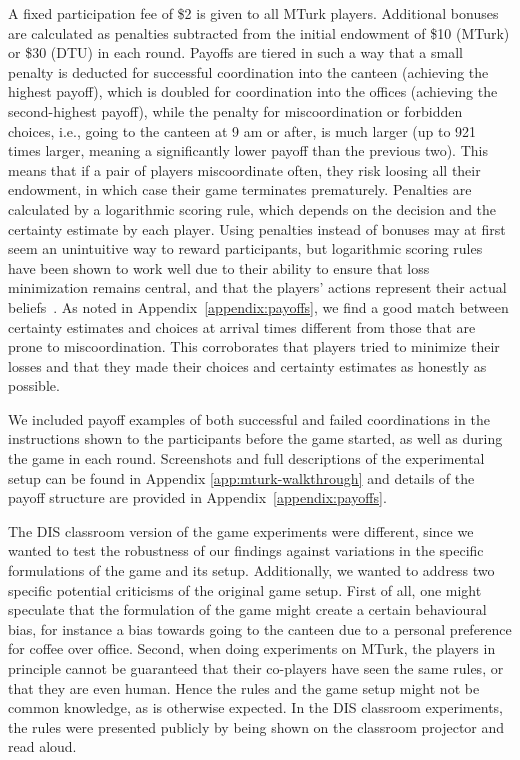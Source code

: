 A fixed participation fee of \$2 is given to all MTurk players. Additional bonuses are calculated as penalties subtracted from the initial endowment of \$10 (MTurk) or \$30 (DTU) in each round. Payoffs are tiered in such a way that a small penalty is deducted for successful coordination into the canteen (achieving the highest payoff), which is doubled for coordination into the offices (achieving the second-highest payoff), while the penalty for miscoordination or forbidden choices, i.e., going to the canteen at 9 am or after, is much larger (up to 921 times larger, meaning a significantly lower payoff than the previous two). This means that if a pair of players miscoordinate often, they risk loosing all their endowment, in which case their game terminates prematurely. Penalties are calculated by a logarithmic scoring rule, which depends on the decision and the certainty estimate by each player. Using penalties instead of bonuses may at first seem an unintuitive way to reward participants, but logarithmic scoring rules have been shown to work well due to their ability to ensure that loss minimization remains central, and that the players' actions represent their actual beliefs~\cite{good1992rational, seidenfeld1985calibration, palfrey2009eliciting, mccutcheon2019favor}. %
As noted in Appendix~\ref{appendix:payoffs}, we find a good match between certainty estimates and choices at arrival times different from those that are prone to miscoordination. This corroborates that players tried to minimize their losses and that they made their choices and certainty estimates as honestly as possible. 

We included payoff examples of both successful and failed coordinations in the instructions shown to the participants before the game started, as well as during the game in each round. Screenshots and full descriptions of the experimental setup can be found in Appendix \ref{app:mturk-walkthrough} and details of the payoff structure are provided in Appendix~\ref{appendix:payoffs}. %

The DIS classroom version of the game experiments were different, since we wanted to test the robustness of our findings against variations in the specific formulations of the game and its setup. Additionally, we wanted to address two specific potential criticisms of the original game setup. First of all, one might speculate that the formulation of the game might create a certain behavioural bias, for instance a bias towards going to the canteen due to a personal preference for coffee over office. Second, when doing experiments on MTurk, the players  in principle cannot be guaranteed that their co-players have seen the same rules, or that they are even human. Hence the rules and the game setup might not be common knowledge, as is otherwise expected. In the DIS classroom experiments, the rules were presented publicly by being shown on the classroom projector and read aloud.

